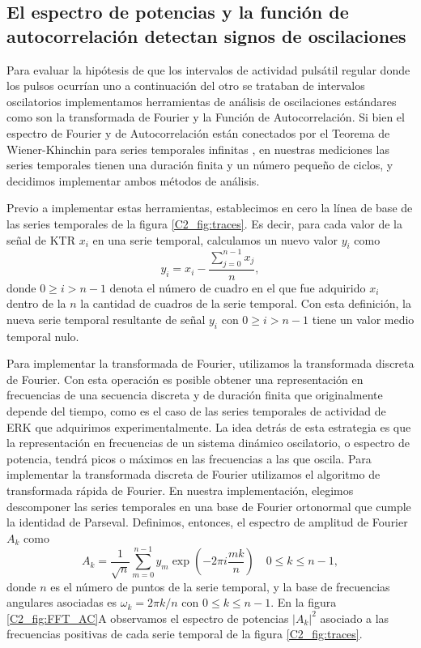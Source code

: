 \documentclass[./main.tex]{subfiles}
\begin{document}
\subsection{El espectro de potencias y la función de autocorrelación detectan signos de oscilaciones}


Para evaluar la hipótesis de que los intervalos de actividad pulsátil regular donde los pulsos ocurrían uno a continuación del otro se trataban de intervalos oscilatorios implementamos herramientas de análisis de oscilaciones estándares como son la transformada de Fourier y la Función de Autocorrelación. Si bien el espectro de Fourier y de Autocorrelación están conectados por el Teorema de Wiener-Khinchin para series temporales infinitas \cite{Gardiner}, en nuestras mediciones las series temporales tienen una duración finita y un número pequeño de ciclos, y decidimos implementar ambos métodos de análisis. 


Previo a implementar estas herramientas, establecimos en cero la línea de base de las series temporales de la figura \ref{C2_fig:traces}. Es decir, para cada valor de la señal de KTR $x_i$ en una serie temporal, calculamos un nuevo valor $y_i$ como
\begin{equation}
    y_i = x_i - \frac{\sum_{j=0}^{n-1} x_j}{n},
    \label{C2_eq:base_cero}
\end{equation}
donde $0 \geq i > n-1$ denota el número de cuadro en el que fue adquirido $x_i$ dentro de la $n$ la cantidad de cuadros de la serie temporal. Con esta definición, la nueva serie temporal resultante de señal $y_i$ con $0 \geq i > n-1$ tiene un valor medio temporal nulo.


Para implementar la transformada de Fourier, utilizamos la transformada discreta de Fourier. Con esta operación es posible obtener una representación en frecuencias de una secuencia discreta y de duración finita que originalmente depende del tiempo, como es el caso de las series temporales de actividad de ERK que adquirimos experimentalmente. La idea detrás de esta estrategia es que la representación en frecuencias de un sistema dinámico oscilatorio, o espectro de potencia, tendrá picos o máximos en las frecuencias a las que oscila. Para implementar la transformada discreta de Fourier utilizamos el algoritmo de transformada rápida de Fourier. En nuestra implementación, elegimos descomponer las series temporales en una base de Fourier ortonormal que cumple la identidad de Parseval. Definimos, entonces, el espectro de amplitud de Fourier $A_k$ como \cite{Harris2020}
\begin{equation}
   A_k = \frac{1}{\sqrt{n}} \sum_{m=0}^{n-1} y_m \exp{(-2\pi i \frac{mk}{n})} \quad 0 \leq k \leq n-1,
   \label{C2_eq:amplitud_fourier}
\end{equation}
donde $n$ es el número de puntos de la serie temporal, y la base de frecuencias angulares asociadas es $\omega_k = 2\pi k/n$ con $0 \leq k \leq n-1$. En la figura \ref{C2_fig:FFT_AC}A observamos el espectro de potencias $|A_k|^2$ asociado a las frecuencias positivas de cada serie temporal de la figura \ref{C2_fig:traces}. 
\end{document}
